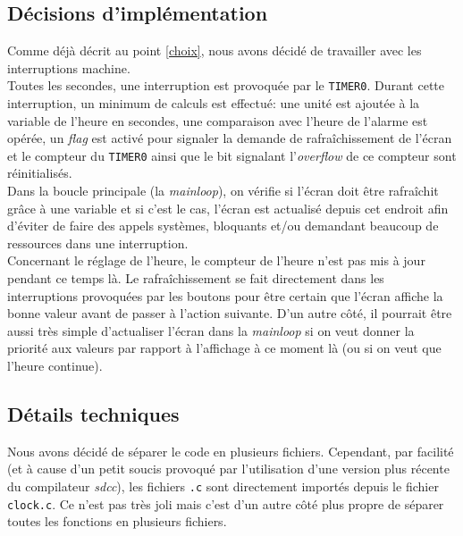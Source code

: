 \subsection{Décisions d'implémentation}

Comme déjà décrit au point \ref{choix}, nous avons décidé de travailler avec les interruptions machine.\\

Toutes les secondes, une interruption est provoquée par le \texttt{TIMER0}. Durant cette interruption, un minimum de calculs est effectué: une unité est ajoutée à la variable de l'heure en secondes, une comparaison avec l'heure de l'alarme est opérée, un \textit{flag} est activé pour signaler la demande de rafraîchissement de l'écran et le compteur du \texttt{TIMER0} ainsi que le bit signalant l'\textit{overflow} de ce compteur sont réinitialisés.\\
Dans la boucle principale (la \textit{mainloop}), on vérifie si l'écran doit être rafraîchit grâce à une variable et si c'est le cas, l'écran est actualisé depuis cet endroit afin d'éviter de faire des appels systèmes, bloquants et/ou demandant beaucoup de ressources dans une interruption.\\

Concernant le réglage de l'heure, le compteur de l'heure n'est pas mis à jour pendant ce temps là. Le rafraîchissement se fait directement dans les interruptions provoquées par les boutons pour être certain que l'écran affiche la bonne valeur avant de passer à l'action suivante. D'un autre côté, il pourrait être aussi très simple d'actualiser l'écran dans la \textit{mainloop} si on veut donner la priorité aux valeurs par rapport à l'affichage à ce moment là (ou si on veut que l'heure continue).

\subsection{Détails techniques}

Nous avons décidé de séparer le code en plusieurs fichiers. Cependant, par facilité (et à cause d'un petit soucis provoqué par l'utilisation d'une version plus récente du compilateur \textit{sdcc}), les fichiers \texttt{.c} sont directement importés depuis le fichier \texttt{clock.c}. Ce n'est pas très joli mais c'est d'un autre côté plus propre de séparer toutes les fonctions en plusieurs fichiers.
